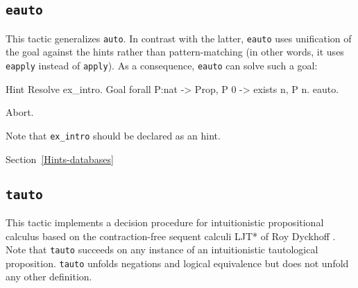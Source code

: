 \subsection{\tt eauto
\label{eauto}}

This tactic generalizes {\tt auto}. In contrast with 
the latter, {\tt eauto} uses unification of the goal
against the hints rather than pattern-matching
(in other words, it uses {\tt eapply} instead of
{\tt apply}).
As a consequence, {\tt eauto} can solve such a goal:

\begin{coq_example}
Hint Resolve ex_intro.
Goal forall P:nat -> Prop, P 0 ->  exists n, P n.
eauto.
\end{coq_example}
\begin{coq_eval}
Abort.
\end{coq_eval}

Note that {\tt ex\_intro} should be declared as an
hint.

\SeeAlso Section~\ref{Hints-databases}

% 


\subsection{\tt tauto
\label{tauto}}

This tactic implements a decision procedure for intuitionistic propositional
calculus based on the contraction-free sequent calculi LJT* of Roy Dyckhoff
\cite{Dyc92}. Note that {\tt tauto} succeeds on any instance of an
intuitionistic tautological proposition. {\tt tauto} unfolds negations
and logical equivalence but does not unfold any other definition.

